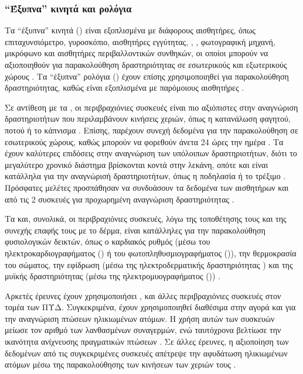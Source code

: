 \subsubsection{``Έξυπνα'' κινητά και ρολόγια}
Τα ``έξυπνα'' κινητά () είναι εξοπλισμένα με διάφορους αισθητήρες, όπως επιταχυνσιόμετρο, γυροσκόπιο, αισθητήρες εγγύτητας, , , φωτογραφική μηχανή, μικρόφωνο και αισθητήρες περιβαλλοντικών συνθηκών, οι οποίοι μπορούν να αξιοποιηθούν για παρακολούθηση δραστηριότητας σε εσωτερικούς και εξωτερικούς χώρους \cite{Incel2013}.
Τα ``έξυπνα'' ρολόγια () έχουν επίσης χρησιμοποιηθεί για παρακολούθηση δραστηριότητας, καθώς είναι εξοπλισμένα με παρόμοιους αισθητήρες \cite{Chernbumroong2011}\cite{Sen2015}.
\par
Σε αντίθεση με τα , οι περιβραχιόνιες συσκευές είναι πιο αξιόπιστες στην αναγνώριση δραστηριοτήτων που περιλαμβάνουν κινήσεις χεριών, όπως η κατανάλωση φαγητού, ποτού ή το κάπνισμα \cite{Shoaib2016}.
Επίσης, παρέχουν συνεχή δεδομένα για την παρακολούθηση σε εσωτερικούς χώρους, καθώς μπορούν να φορεθούν άνετα 24 ώρες την ημέρα \cite{Bieber2013}\cite{Rawassizadeh2014}.
Τα  έχουν καλύτερες επιδόσεις στην αναγνώριση των υπόλοιπων δραστηριοτήτων, διότι το μεγαλύτερο χρονικό διάστημα βρίσκονται κοντά στην λεκάνη, οπότε και είναι κατάλληλα για την αναγνώρισή δραστηριοτήτων, όπως η ποδηλασία ή το τρέξιμο \cite{Shoaib2016}\cite{Bieber2013}.
Πρόσφατες μελέτες προσπάθησαν να συνδυάσουν τα δεδομένα των αισθητήρων και από τις 2 συσκευές για προχωρημένη αναγνώριση δραστηριότητας \cite{Shoaib2016}\cite{Casilari2015}.
\par
Τα  και, συνολικά, οι περιβραχιόνιες συσκευές, λόγω της τοποθέτησης τους και της συνεχής επαφής τους με το δέρμα, είναι κατάλληλες για την παρακολούθηση φυσιολογικών δεικτών, όπως ο καρδιακός ρυθμός (μέσω του ηλεκτροκαρδιογραφήματος () ή του φωτοπληθυσμιογραφήματος ()), την θερμοκρασία του σώματος, την εφίδρωση (μέσω της ηλεκτροδερματικής δραστηριότητας ) και της μυϊκής δραστηριότητας (μέσω της ηλεκτρομυογραφήματος ()) \cite{Rawassizadeh2014}\cite{Klonovs2016}.
\par
Αρκετές έρευνες έχουν χρησιμοποιήσει ,  και άλλες περιβραχιόνιες 
συσκευές στον τομέα των ΠΥΔ.
Συγκεκριμένα, έχουν χρησιμοποιηθεί διαθέσιμα στην αγορά  και  για την αναγνώριση πτώσεων ηλικιωμένων ατόμων.
Η χρήση αυτών των συσκευών μείωσε τον αριθμό των λανθασμένων συναγερμών, ενώ ταυτόχρονα βελτίωσε την ικανότητα ανίχνευσης πραγματικών πτώσεων \cite{Casilari2015}.
Σε άλλες έρευνες, η αξιοποίηση των δεδομένων από τις συγκεκριμένες συσκευές απέτρεψε την αφυδάτωση ηλικιωμένων ατόμων μέσω της παρακολούθησης των κινήσεων των χεριών τους \cite{Lutze2015}.

